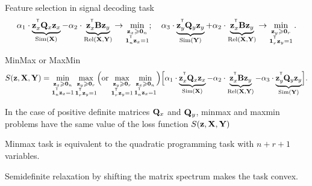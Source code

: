 \documentclass[10pt]{beamer}
\begin{document}
\begin{frame}{Feature selection in signal decoding task}
	\[
		\alpha_1 \cdot \underbrace{\bz_x^{\T} \bQ_x \bz_x}_{\text{Sim}(\bX)} - \alpha_2 \cdot \underbrace{\vphantom{()} \bz_x^{\T}\mathbf{B} \bz_y}_{\text{Rel}(\bX, \bY)} \rightarrow \min_{\substack{\bz_x \geq \bZero_n \\ \bOne_n^{\T}\bz_x=1}}; \quad
		\alpha_3 \cdot \underbrace{\bz_y^{\T} \bQ_y \bz_y}_{\text{Sim}(\bY)} + \alpha_2 \cdot \underbrace{\vphantom{()} \bz_x^{\T} \mathbf{B} \bz_y}_{\text{Rel}(\bX, \bY)} \rightarrow \min_{\substack{\bz_y \geq \bZero_r  \\ \bOne_r^{\T}\bz_y=1}}.
	\]
	\vspace{-0.3cm}
	\begin{block}{MinMax or MaxMin}
		\vspace{-0.6cm}
		\[
		S(\bz, \bX, \bY) = \min_{\substack{\bz_x \geq \bZero_n \\ \bOne_n^{\T}\bz_x=1}} 	\max_{\substack{\bz_y \geq \bZero_r \\ \bOne_r^{\T}\bz_y=1}} \Bigl(\text {or} \, \max_{\substack{\bz_y \geq \bZero_r \\ \bOne_r^{\T}\bz_y=1}} \min_{\substack{\bz_x \geq \bZero_n \\ \bOne_n^{\T}\bz_x=1}}\Bigr) \Bigl[\alpha_1 \cdot \underbrace{\bz_x^{\T} \bQ_x \bz_x}_{\text{Sim}(\bX)} - \alpha_2 \cdot \underbrace{\bz_x^{\T} \bB \bz_y}_{\text{Rel}(\bX, \bY)} - \alpha_3 \cdot \underbrace{\bz_y^{\T} \bQ_y \bz_y}_{\text{Sim}(\bY)}\Bigr].
		\]
	\end{block}
	\vspace{-0.4cm}
	\begin{theorem}[Isachenko, 2018]
		In the case of positive definite matrices $\bQ_x$ and $\bQ_y$, minmax and maxmin problems have the same value of the loss function $S(\bz, \bX, \bY)$
	\end{theorem}
	\vspace{-0.2cm}
	\begin{theorem}[Isachenko, 2018]
		Minmax task is equivalent to the quadratic programming task with $n + r + 1$ variables.
	\end{theorem}
	Semidefinite relaxation by shifting the matrix spectrum makes the task convex.

\end{frame}
\end{document}
